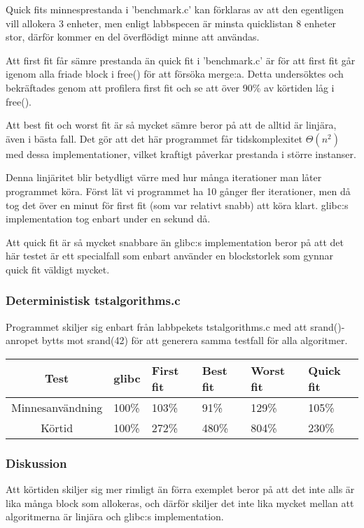 \documentclass[a4paper,11pt]{article}
\begin{document}
Quick fits minnesprestanda i 'benchmark.c' kan förklaras av att den egentligen vill allokera 3 enheter, men enligt labbspecen är minsta quicklistan 8 enheter stor, därför kommer en del överflödigt minne att användas.

Att first fit får sämre prestanda än quick fit i 'benchmark.c' är för att first fit går igenom alla friade block i free() för att försöka merge:a. Detta undersöktes och bekräftades genom att profilera first fit och se att över 90\% av körtiden låg i free().

Att best fit och worst fit är så mycket sämre beror på att de alltid är linjära, även i bästa fall. Det gör att det här programmet får tidskomplexitet $\Theta(n^2)$ med dessa implementationer, vilket kraftigt påverkar prestanda i större instanser.

Denna linjäritet blir betydligt värre med hur många iterationer man låter programmet köra. Först lät vi programmet ha 10 gånger fler iterationer, men då tog det över en minut för first fit (som var relativt snabb) att köra klart. glibc:s implementation tog enbart under en sekund då.

Att quick fit är så mycket snabbare än glibc:s implementation beror på att det här testet är ett specialfall som enbart använder en blockstorlek som gynnar quick fit väldigt mycket.

\subsubsection*{Deterministisk tstalgorithms.c}
Programmet skiljer sig enbart från labbpekets tstalgorithms.c med att srand()-anropet bytts mot srand(42) för att generera samma testfall för alla algoritmer.\\

\begin{tabular}{|c||l|l|l|l|l|}
	\hline
	Test & glibc & First fit & Best fit & Worst fit & Quick fit \\
	\hline
	Minnesanvändning & 100\% & 103\% & 91\% & 129\% & 105\% \\
	Körtid & 100\% & 272\% & 480\% & 804\% & 230\%\\
	\hline
\end{tabular}

\subsubsection*{Diskussion}

Att körtiden skiljer sig mer rimligt än förra exemplet beror på att det inte alls är lika många block som allokeras, och därför skiljer det inte lika mycket mellan att algoritmerna är linjära och glibc:s implementation.
\end{document}
